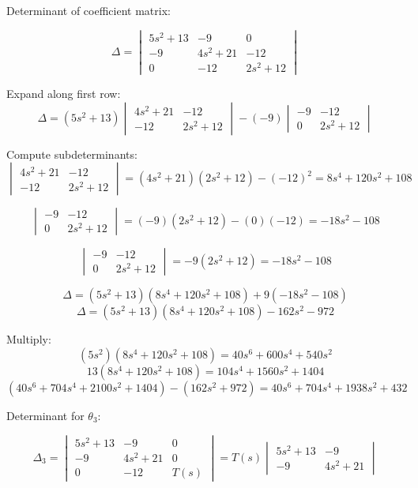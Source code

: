 Determinant of coefficient matrix:

\[
\Delta = 
\begin{vmatrix}
5s^2 + 13 & -9 & 0 \\
-9 & 4s^2 + 21 & -12 \\
0 & -12 & 2s^2 + 12
\end{vmatrix}
\]

Expand along first row:
\[
\Delta = (5s^2+13)\begin{vmatrix}4s^2+21 & -12 \\ -12 & 2s^2+12\end{vmatrix} - (-9) \begin{vmatrix}-9 & -12 \\ 0 & 2s^2+12 \end{vmatrix}
\]

Compute subdeterminants:
\[
\begin{vmatrix}
4s^2+21 & -12 \\
-12 & 2s^2+12
\end{vmatrix}
= (4s^2+21)(2s^2+12) - (-12)^2  = 8s^4 + 120s^2 + 108
\]

\[
\begin{vmatrix}
-9 & -12 \\
0 & 2s^2+12
\end{vmatrix}
= (-9)(2s^2+12) - (0)(-12) = -18s^2 - 108
\]

\[
\begin{vmatrix}
-9 & -12 \\
0 & 2s^2+12
\end{vmatrix}
= -9(2s^2+12) = -18s^2 - 108
\]

\[
\Delta = (5s^2+13)(8 s^4 + 120 s^2 + 108) + 9(-18 s^2 -108)
\]
\[
\Delta = (5s^2+13)(8 s^4 + 120 s^2 + 108) - 162 s^2 - 972
\]

Multiply:
\[
(5s^2)(8 s^4 + 120 s^2 + 108) = 40 s^6 + 600 s^4 + 540 s^2
\]
\[
13(8 s^4 + 120 s^2 + 108) = 104 s^4 + 1560 s^2 + 1404
\]
\[
(40 s^6 + 704 s^4 + 2100 s^2 + 1404) - (162 s^2 + 972) = 40 s^6 + 704 s^4 + 1938 s^2 + 432
\]

Determinant for \(\theta_3\):

\[
\Delta_3 = 
\begin{vmatrix}
5 s^2 + 13 & -9 & 0 \\
-9 & 4s^2 + 21 & 0 \\
0 & -12 & T(s)
\end{vmatrix}
= T(s) \begin{vmatrix}5s^2 + 13 & -9 \\ -9 & 4s^2 + 21 \end{vmatrix}
\]

